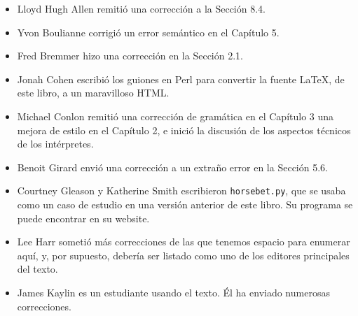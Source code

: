 \begin{itemize}

\item Lloyd Hugh Allen remitió una corrección a la Sección 8.4.

\item Yvon Boulianne corrigió un error semántico en el Capítulo 5.

\item Fred Bremmer hizo una corrección en la Sección 2.1.

\item Jonah Cohen escribió los guiones en Perl para convertir la fuente
LaTeX, de este libro, a un maravilloso HTML.


\item Michael Conlon remitió una corrección de gramática en el Capítulo 3
una mejora de estilo en el Capítulo 2, e inició la discusión de 
los aspectos técnicos de los intérpretes.


\item Benoit Girard envió una corrección a un extraño error en la Sección 5.6.


\item Courtney Gleason y Katherine Smith escribieron \texttt{horsebet.py}, que
se usaba como un caso de estudio en una versión anterior de este libro.  Su 
programa se puede encontrar en su website.


\item Lee Harr sometió más correcciones de las que tenemos espacio para enumerar aquí, 
y, por supuesto, debería ser listado como uno de los editores principales del 
texto.


\item James Kaylin es un estudiante usando el texto. Él ha enviado numerosas
correcciones.



\end{itemize}
